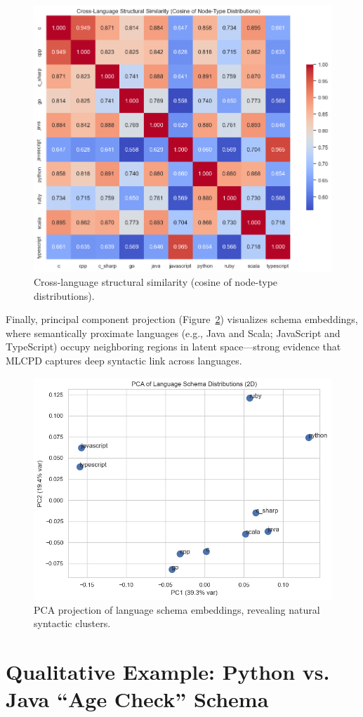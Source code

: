 \documentclass{article}
\begin{document}
\begin{figure}[H]
\centering
\includegraphics[width=0.8\linewidth]{cross_language_similarity_heatmap.png}
\caption{Cross-language structural similarity (cosine of node-type distributions).}
\label{fig:cross-lang-heatmap}
\end{figure}

Finally, principal component projection (Figure~\ref{fig:pca-schema}) visualizes schema embeddings, where semantically proximate languages (e.g., Java and Scala; JavaScript and TypeScript) occupy neighboring regions in latent space—strong evidence that MLCPD captures deep syntactic link across languages.

\begin{figure}[H]
\centering
\includegraphics[width=0.6\linewidth]{schema_pca_scatter.png}
\caption{PCA projection of language schema embeddings, revealing natural syntactic clusters.}
\label{fig:pca-schema}
\end{figure}

\section{Qualitative Example: Python vs. Java “Age Check” Schema}
\end{document}
